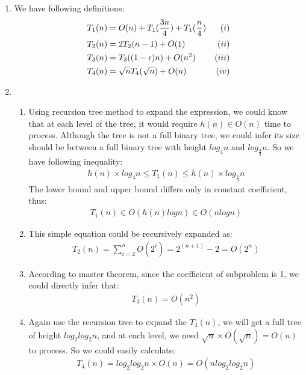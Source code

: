 \documentclass[paper=a4, fontsize=11pt]{scrartcl} %
\newcommand{\Rn}[1]{\uppercase\expandafter{\romannumeral #1\relax}}
\numberwithin{equation}{section} %
\numberwithin{figure}{section} %
\numberwithin{table}{section} %
\begin{document}
{\begin{enumerate}[label={2.(\alph*)}]
  \item We have following definitions:
    \begin{align*}
      & T_1(n) = O(n) + T_1(\frac{3n}{4}) + T_1(\frac{n}{4}) & (\Rn{1}) \\
      & T_2(n) = 2T_2(n-1) + O(1) & (\Rn{2}) \\
      & T_3(n) = T_3((1-\epsilon)n) + O(n^2) & (\Rn{3})  \\
      & T_4(n) = \sqrt{n}T_4(\sqrt{n}) + O(n) & (\Rn{4}) 
    \end{align*}

  \item 
    \begin{enumerate}[label={\roman*.}]
      \item Using recursion tree method to expand the expression, we could know
	that at each level of the tree, it would require $h(n) \in O(n)$ time to
	process. Although the tree is not a full binary tree, we could infer its size
	should be between a full binary tree with height $log_4n$ and
	$log_\frac{4}{3}n$. So we have following inequality:
	\begin{align*}
	  h(n) \times log_4n \leq T_1(n) \leq h(n) \times log_\frac{4}{3}n
	\end{align*}
	The lower bound and upper bound differs only in constant coefficient, thus:
	\begin{align*}
	  T_1(n) \in O(h(n) logn) \in O(n log n)
	\end{align*}

      \item This simple equation could be recursively expanded as:
	\begin{align*}
	  T_2(n) = \sum_{i=2}^{n} O(2^i) = 2^{(n+1)}-2 = O(2^n)
	\end{align*}

      \item According to master theorem, since the coefficient of subproblem is 1,
	we could directly infer that:
	\begin{align*}
	  T_3(n) = O(n^2)
	\end{align*}

      \item Again use the recursion tree to expand the $T_4(n)$, we will get a
	full tree of height $log_2log_2n$, and at each level, we need $\sqrt{n}
	\times O(\sqrt{n}) = O(n)$ to process. So we could easily calculate:
	\begin{align*}
	  T_4(n) = log_2log_2n \times O(n) = O(n log_2log_2n)
	\end{align*}


\end{enumerate}
\end{enumerate}}
\end{document}
